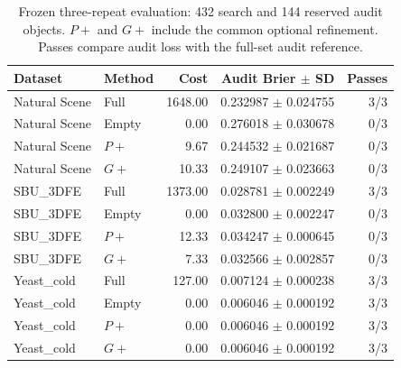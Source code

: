 \begin{table}[htbp]
\centering\small\renewcommand{\arraystretch}{1.3}\setlength{\tabcolsep}{5pt}
\caption{Frozen three-repeat evaluation: 432 search and 144 reserved audit objects. $P+$ and $G+$ include the common optional refinement. Passes compare audit loss with the full-set audit reference.}
\label{tab:main-results}
\begin{tabular}{llrrr}\hline
Dataset & Method & Cost & Audit Brier $\pm$ SD & Passes\\\hline
Natural Scene & Full & 1648.00 & 0.232987 $\pm$ 0.024755 & 3/3\\
Natural Scene & Empty & 0.00 & 0.276018 $\pm$ 0.030678 & 0/3\\
Natural Scene & $P+$ & 9.67 & 0.244532 $\pm$ 0.021687 & 0/3\\
Natural Scene & $G+$ & 10.33 & 0.249107 $\pm$ 0.023663 & 0/3\\
SBU\_3DFE & Full & 1373.00 & 0.028781 $\pm$ 0.002249 & 3/3\\
SBU\_3DFE & Empty & 0.00 & 0.032800 $\pm$ 0.002247 & 0/3\\
SBU\_3DFE & $P+$ & 12.33 & 0.034247 $\pm$ 0.000645 & 0/3\\
SBU\_3DFE & $G+$ & 7.33 & 0.032566 $\pm$ 0.002857 & 0/3\\
Yeast\_cold & Full & 127.00 & 0.007124 $\pm$ 0.000238 & 3/3\\
Yeast\_cold & Empty & 0.00 & 0.006046 $\pm$ 0.000192 & 3/3\\
Yeast\_cold & $P+$ & 0.00 & 0.006046 $\pm$ 0.000192 & 3/3\\
Yeast\_cold & $G+$ & 0.00 & 0.006046 $\pm$ 0.000192 & 3/3\\
\hline\end{tabular}\end{table}
